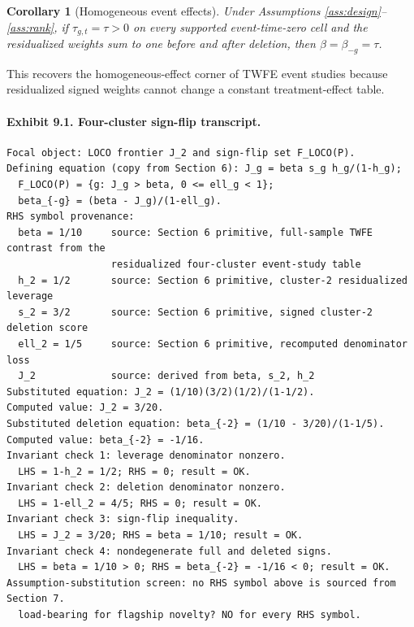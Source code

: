 \documentclass[11pt]{article}
\theoremstyle{definition}
\theoremstyle{plain}
\newtheorem{corollary}{Corollary}
\theoremstyle{remark}
\begin{document}
\begin{corollary}[Homogeneous event effects]\label{cor:homogeneous}
Under Assumptions \ref{ass:design}--\ref{ass:rank}, if $\tau_{g,t}=\tau>0$ on every supported event-time-zero cell and the residualized weights sum to one before and after deletion, then $\beta=\beta_{-g}=\tau$.
\end{corollary}
This recovers the homogeneous-effect corner of TWFE event studies because residualized signed weights cannot change a constant treatment-effect table.

\paragraph{Exhibit 9.1. Four-cluster sign-flip transcript.}
\begin{verbatim}
Focal object: LOCO frontier J_2 and sign-flip set F_LOCO(P).
Defining equation (copy from Section 6): J_g = beta s_g h_g/(1-h_g);
  F_LOCO(P) = {g: J_g > beta, 0 <= ell_g < 1};
  beta_{-g} = (beta - J_g)/(1-ell_g).
RHS symbol provenance:
  beta = 1/10     source: Section 6 primitive, full-sample TWFE contrast from the
                  residualized four-cluster event-study table
  h_2 = 1/2       source: Section 6 primitive, cluster-2 residualized leverage
  s_2 = 3/2       source: Section 6 primitive, signed cluster-2 deletion score
  ell_2 = 1/5     source: Section 6 primitive, recomputed denominator loss
  J_2             source: derived from beta, s_2, h_2
Substituted equation: J_2 = (1/10)(3/2)(1/2)/(1-1/2).
Computed value: J_2 = 3/20.
Substituted deletion equation: beta_{-2} = (1/10 - 3/20)/(1-1/5).
Computed value: beta_{-2} = -1/16.
Invariant check 1: leverage denominator nonzero.
  LHS = 1-h_2 = 1/2; RHS = 0; result = OK.
Invariant check 2: deletion denominator nonzero.
  LHS = 1-ell_2 = 4/5; RHS = 0; result = OK.
Invariant check 3: sign-flip inequality.
  LHS = J_2 = 3/20; RHS = beta = 1/10; result = OK.
Invariant check 4: nondegenerate full and deleted signs.
  LHS = beta = 1/10 > 0; RHS = beta_{-2} = -1/16 < 0; result = OK.
Assumption-substitution screen: no RHS symbol above is sourced from Section 7.
  load-bearing for flagship novelty? NO for every RHS symbol.
\end{verbatim}
\end{document}
